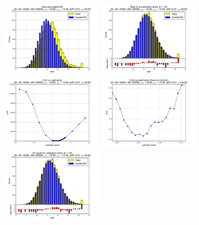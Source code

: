 
 \begin{figure}[htbp] \begin{center} 
\includegraphics[width=0.45\textwidth]{../FIGURES/22/FIG_Data_and_scaled_MC.pdf} 
\includegraphics[width=0.45\textwidth]{../FIGURES/22/FIG_Best_fit_at_calibration_factor_of_1_106.pdf} 
\includegraphics[width=0.45\textwidth]{../FIGURES/22/FIG_Chi2_vs_calib_factor.pdf} 
\includegraphics[width=0.45\textwidth]{../FIGURES/22/FIG_Chi2_vs_calib_factor_Zoom_on_chi2min.pdf} 
\includegraphics[width=0.45\textwidth]{../FIGURES/22/FIG_Fit_result_for_calibration_factor_of_1_102.pdf} 

\end{center}
\end{figure}
